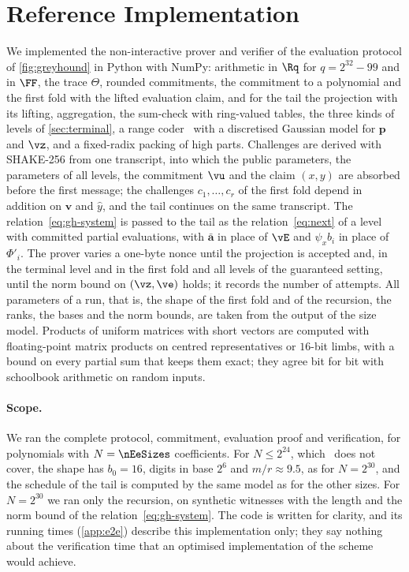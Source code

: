 \section{Reference Implementation}\label{sec:impl}

We implemented the non-interactive prover and verifier of the evaluation protocol of \cref{fig:greyhound} in Python with NumPy: arithmetic in $\Rq$ for $q=2^{32}-99$ and in $\FF$, the trace $\Theta$, rounded commitments, the commitment to a polynomial and the first fold with the lifted evaluation claim, and for the tail the projection with its lifting, aggregation, the sum-check with ring-valued tables, the three kinds of levels of \cref{sec:terminal}, a range coder~\cite{WNC87} with a discretised Gaussian model for $\mathbf p$ and $\vz$, and a fixed-radix packing of high parts. Challenges are derived with SHAKE-256 from one transcript, into which the public parameters, the parameters of all levels, the commitment $\vu$ and the claim $(x,y)$ are absorbed before the first message; the challenges $c_1,\dots,c_r$ of the first fold depend in addition on $\mathbf v$ and $\hat y$, and the tail continues on the same transcript. The relation~\eqref{eq:gh-system} is passed to the tail as the relation~\eqref{eq:next} of a level with committed partial evaluations, with $\bar{\mathbf a}$ in place of $\vE$ and $\psi_xb_i$ in place of $\Phi'_i$. The prover varies a one-byte nonce until the projection is accepted and, in the terminal level and in the first fold and all levels of the guaranteed setting, until the norm bound on $(\vz,\ve)$ holds; it records the number of attempts. All parameters of a run, that is, the shape of the first fold and of the recursion, the ranks, the bases and the norm bounds, are taken from the output of the size model. Products of uniform matrices with short vectors are computed with floating-point matrix products on centred representatives or $16$-bit limbs, with a bound on every partial sum that keeps them exact; they agree bit for bit with schoolbook arithmetic on random inputs.

\paragraph{Scope.}
We ran the complete protocol, commitment, evaluation proof and verification, for polynomials with $N=\nEeSizes$ coefficients. For $N\le2^{24}$, which~\cite[Table~4]{NS24} does not cover, the shape has $b_0=16$, digits in base $2^6$ and $m/r\approx9.5$, as for $N=2^{30}$, and the schedule of the tail is computed by the same model as for the other sizes. For $N=2^{30}$ we ran only the recursion, on synthetic witnesses with the length and the norm bound of the relation~\eqref{eq:gh-system}. The code is written for clarity, and its running times (\cref{app:e2e}) describe this implementation only; they say nothing about the verification time that an optimised implementation of the scheme would achieve.


